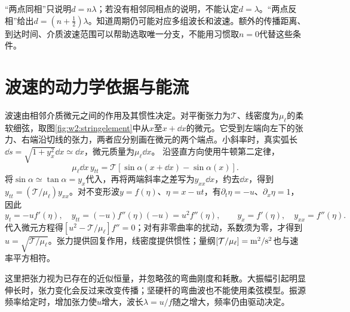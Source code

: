 “两点同相”只说明$d=n\lambda$；若没有相邻同相点的说明，不能认定$d=\lambda$。“两点反相”给出$d=(n+\frac12)\lambda$。知道周期仍可能对应多组波长和波速。额外的传播距离、到达时间、介质波速范围可以帮助选取唯一分支，不能用习惯取$n=0$代替这些条件。

\section{波速的动力学依据与能流}
波速由相邻介质微元之间的作用及其惯性决定。对平衡张力为$\mathcal T$、线密度为$\mu_\ell$的柔软细弦，取图\ref{fig:w2:stringelement}中从$x$至$x+\dd x$的微元。它受到左端向左下的张力、右端沿切线的张力，两者应分别画在微元的两个端点。小斜率时，真实弧长$\dd s=\sqrt{1+y_x^2}\dd x\simeq\dd x$，微元质量为$\mu_\ell\dd x$。
沿竖直方向使用牛顿第二定律，
\[
\mu_\ell\dd x\,y_{tt}
=\mathcal T[\sin\alpha(x+\dd x)-\sin\alpha(x)].
\]
将$\sin\alpha\simeq\tan\alpha=y_x$代入，再将两端斜率之差写为$y_{xx}\dd x$，约去$\dd x$，得到$y_{tt}=(\mathcal T/\mu_\ell)y_{xx}$。对不变形波$y=f(\eta)$、$\eta=x-ut$，有$\partial_t\eta=-u$、$\partial_x\eta=1$，因此
\[
y_t=-u f'(\eta),\quad y_{tt}=(-u)f''(\eta)(-u)=u^2f''(\eta),
\qquad y_x=f'(\eta),\quad y_{xx}=f''(\eta).
\]
代入微元方程得$[u^2-\mathcal T/\mu_\ell]f''=0$；对有非零曲率的扰动，系数须为零，才得到$u=\sqrt{\mathcal T/\mu_\ell}$。张力提供回复作用，线密度提供惯性；量纲$[\mathcal T/\mu_\ell]={\rm m^2/s^2}$也与速率平方相符。

这里把张力视为已存在的近似恒量，并忽略弦的弯曲刚度和耗散。大振幅引起明显伸长时，张力变化会反过来改变传播；坚硬杆的弯曲波也不能使用柔弦模型。振源频率给定时，增加张力使$u$增大，波长$\lambda=u/f$随之增大，频率仍由驱动决定。


